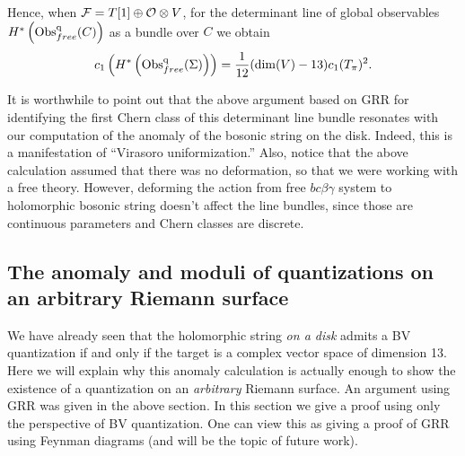 Hence, when $\mathcal F = T[1] \oplus \mathcal O \otimes V$, for the determinant line of global observables $H^*\left({\rm Obs}^{\rm q}_{free}(C)\right)$ as a bundle over $C$ we obtain
\[
c_1\left(H^*\left({\rm Obs}^{\rm q}_{free}(\Sigma)\right)\right) = \frac{1}{12} (\dim(V) - 13) c_1(T_\pi)^2 .
\]


It is worthwhile to point out that the above argument based on GRR for identifying the first Chern class of this determinant line bundle resonates with our computation of the anomaly of the bosonic string on the disk. Indeed, this is a manifestation of ``Virasoro uniformization.'' 
Also, notice that the above calculation assumed that there was no deformation, so that we were working with a free theory. 
However, deforming the action from free $bc\beta\gamma$ system to holomorphic bosonic string doesn't affect the line bundles, since those are continuous parameters and Chern classes are discrete.

\subsection{The anomaly and moduli of quantizations on an arbitrary Riemann surface}

We have already seen that the holomorphic string {\it on a disk} admits a BV quantization if and only if the target is a complex vector space of dimension 13.
Here we will explain why this anomaly calculation is actually enough to show the existence of a quantization on an {\it arbitrary} Riemann surface. 
An argument using GRR was given in the above section. 
In this section we give a proof using only the perspective of BV quantization.
One can view this as giving a proof of GRR using Feynman diagrams (and will be the topic of future work). 

